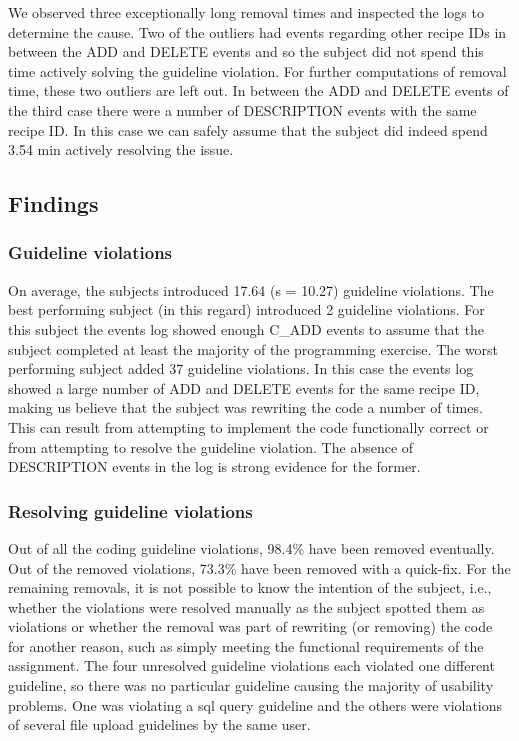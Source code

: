 We observed three exceptionally long removal times and inspected the logs to determine the cause.
Two of the outliers had events regarding other recipe IDs in between the ADD and DELETE events and so the subject did not spend this time actively solving the guideline violation.
For further computations of removal time, these two outliers are left out.
In between the ADD and DELETE events of the third case there were a number of DESCRIPTION events with the same recipe ID. In this case we can safely assume that the subject did indeed spend 3.54 min actively resolving the issue.

\subsection{Findings}
\subsubsection{Guideline violations}
On average, the subjects introduced 17.64 (s = 10.27) guideline violations.
The best performing subject (in this regard) introduced 2 guideline violations.
For this subject the events log showed enough C\_ADD events to assume that the subject completed at least the majority of the programming exercise.
The worst performing subject added 37 guideline violations.
In this case the events log showed a large number of ADD and DELETE events for the same recipe ID, making us believe that the subject was rewriting the code a number of times.
This can result from attempting to implement the code functionally correct or from attempting to resolve the guideline violation.
The absence of DESCRIPTION events in the log is strong evidence for the former. 

\subsubsection{Resolving guideline violations}
Out of all the coding guideline violations, 98.4\% have been removed eventually.
Out of the removed violations, 73.3\% have been removed with a quick-fix.
For the remaining removals, it is not possible to know the intention of the subject, i.e., whether the violations were resolved manually as the subject spotted them as violations or whether the removal was part of rewriting (or removing) the code for another reason, such as simply meeting the functional requirements of the assignment.
The four unresolved guideline violations each violated one different guideline, so there was no particular guideline causing the majority of usability problems.
One was violating a \gls{sql} query guideline and the others were violations of several file upload guidelines by the same user.

